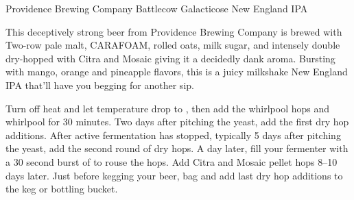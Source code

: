 \begin{recipie}{Providence Brewing Company Battlecow Galacticose New England IPA}

\begin{aboutblock}
This deceptively strong beer from Providence Brewing Company is brewed with
Two-row pale malt, CARA\-FOAM, rolled oats, milk sugar, and intensely double
dry-hopped with Citra and Mosaic giving it a decidedly dank aroma. Bursting
with mango, orange and pineapple flavors, this is a juicy milkshake New England
IPA that'll have you begging for another sip.
\end{aboutblock}


\begin{methodandtiming}
 
\begin{mashsteps}
\end{mashsteps}

\begin{fermentationsteps}
\end{fermentationsteps}

\begin{directions}
Turn off heat and let temperature drop to , then add the whirlpool hops and
whirlpool for 30 minutes. Two days after pitching the yeast, add the first dry hop
additions. After active fermentation has stopped, typically 5 days after pitching the
yeast, add the second round of dry hops. A day later, fill your fermenter
with a 30 second burst of  to rouse the hops. Add  Citra
and  Mosaic pellet hops 8--10 days later. Just before kegging your beer,
bag and add last dry hop additions to the keg or bottling bucket.
\end{directions}

\end{methodandtiming}

\pagebreak

\begin{ingredientsblock}

\begin{malts}
\end{malts}


\end{ingredientsblock}
\end{recipie}
